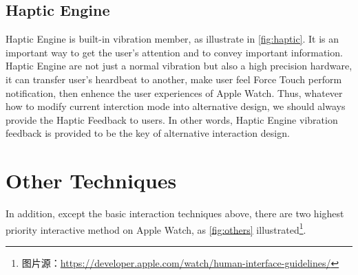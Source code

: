 \subsection{Haptic Engine}

Haptic Engine is built-in vibration member, as illustrate in \ref{fig:haptic}.
It is an important way to get the user's attention and to convey important information.
Haptic Engine are not just a normal vibration but also a high precision hardware, it can transfer user's heardbeat to another, make user feel Force Touch perform notification, then enhence the user experiences of Apple Watch.
Thus, whatever how to modify current interction mode into alternative design, we should always provide the Haptic Feedback to users.
In other words, Haptic Engine vibration feedback is provided to be the key of alternative interaction design.

\section{Other Techniques}

In addition, except the basic interaction techniques above, there are two highest priority interactive method on Apple Watch, as \ref{fig:others} illustrated\footnote{图片源：\url{https://developer.apple.com/watch/human-interface-guidelines/}}.

